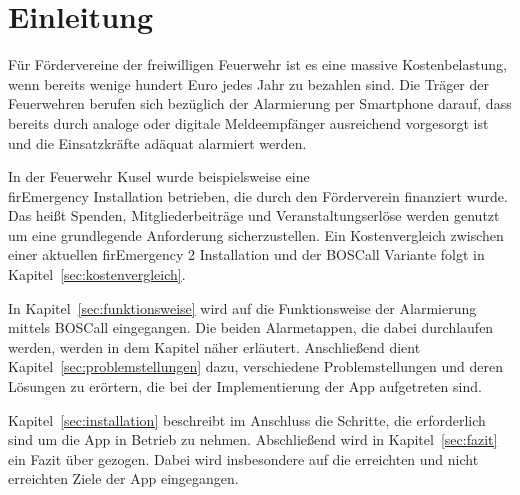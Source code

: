 \section{Einleitung}
Für Fördervereine der freiwilligen Feuerwehr ist es eine massive Kostenbelastung, wenn bereits wenige hundert Euro jedes Jahr zu bezahlen sind. Die Träger der Feuerwehren berufen sich bezüglich der Alarmierung per Smartphone darauf, dass bereits durch analoge oder digitale Meldeempfänger ausreichend vorgesorgt ist und die Einsatzkräfte adäquat alarmiert werden.

In der Feuerwehr Kusel wurde beispielsweise eine\\ firEmergency\cite{Alamos:FE2} Installation betrieben, die durch den Förderverein finanziert wurde. Das heißt Spenden, Mitgliederbeiträge und Veranstaltungserlöse werden genutzt um eine grundlegende Anforderung sicherzustellen. Ein Kostenvergleich zwischen einer aktuellen {firEmergency 2} Installation und der BOSCall Variante folgt in Kapitel~\ref{sec:kostenvergleich}.

In Kapitel~\ref{sec:funktionsweise} wird auf die Funktionsweise der Alarmierung mittels BOSCall eingegangen. Die beiden Alarmetappen, die dabei durchlaufen werden, werden in dem Kapitel näher erläutert. Anschließend dient Kapitel~\ref{sec:problemstellungen} dazu, verschiedene Problemstellungen und deren Lösungen zu erörtern, die bei der Implementierung der App aufgetreten sind.

Kapitel~\ref{sec:installation} beschreibt im Anschluss die Schritte, die erforderlich sind um die App in Betrieb zu nehmen. Abschließend wird in Kapitel~\ref{sec:fazit} ein Fazit über gezogen. Dabei wird insbesondere auf die erreichten und nicht erreichten Ziele der App eingegangen.